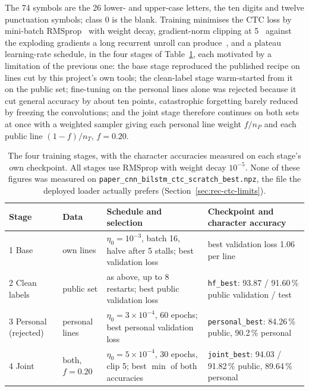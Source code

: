 The 74 symbols are the 26 lower- and upper-case letters, the ten digits and twelve punctuation symbols; class 0 is the blank. Training minimises the CTC loss by mini-batch RMSprop~\cite[Lec.~6e]{tieleman2012} with weight decay, gradient-norm clipping at 5~\cite[Alg.~1]{pascanu2013} against the exploding gradients a long recurrent unroll can produce~\cite{pascanu2013}, and a plateau learning-rate schedule, in the four stages of Table~\ref{tab:rec-stages}, each motivated by a limitation of the previous one: the base stage reproduced the published recipe on lines cut by this project's own tools; the clean-label stage warm-started from it on the public set; fine-tuning on the personal lines alone was rejected because it cut general accuracy by about ten points, catastrophic forgetting barely reduced by freezing the convolutions; and the joint stage therefore continues on both sets at once with a weighted sampler giving each personal line weight $f/n_P$ and each public line $(1-f)/n_T$, $f=0.20$.

\begin{table}[h]
\centering
\fontsize{8.5}{10.2}\selectfont
\setlength{\tabcolsep}{4pt}
\begin{tabularx}{\linewidth}{|p{1.8cm}|p{1.4cm}|X|p{3.4cm}|}
\hline
\textbf{Stage} & \textbf{Data} & \textbf{Schedule and selection} & \textbf{Checkpoint and character accuracy} \\
\hline
1 Base & own lines & $\eta_0=10^{-3}$, batch 16, halve after 5 stalls; best validation loss & best validation loss 1.06 per line \\
\hline
2 Clean labels & public set & as above, up to 8 restarts; best public validation loss & \texttt{hf\_best}: 93.87 / 91.60\,\% public validation / test \\
\hline
3 Personal (rejected) & personal lines & $\eta_0=3\times10^{-4}$, 60 epochs; best personal validation loss & \texttt{personal\_best}: 84.26\,\% public, 90.2\,\% personal \\
\hline
4 Joint & both, $f=0.20$ & $\eta_0=5\times10^{-4}$, 30 epochs, clip 5; best $\min$ of both accuracies & \texttt{joint\_best}: 94.03 / 91.82\,\% public, 89.64\,\% personal \\
\hline
\end{tabularx}
\caption{The four training stages, with the character accuracies measured on each stage's own checkpoint. All stages use RMSprop with weight decay $10^{-5}$. None of these figures was measured on \texttt{paper\_cnn\_bilstm\_ctc\_scratch\_best.npz}, the file the deployed loader actually prefers (Section~\ref{sec:rec-ctc-limits}).}
\label{tab:rec-stages}
\end{table}

